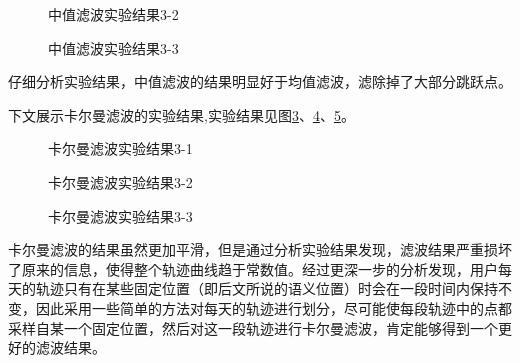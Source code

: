 \begin{figure}[htb]
  \centering%
  \hspace{4em}%
  \caption{中值滤波实验结果3-2}
  \label{fig:3_3_2}
\end{figure}
\begin{figure}[htb]
  \centering%
  \hspace{4em}%
  \caption{中值滤波实验结果3-3}
  \label{fig:3_3_3}
\end{figure}
\par 仔细分析实验结果，中值滤波的结果明显好于均值滤波，滤除掉了大部分跳跃点。
\par 下文展示卡尔曼滤波的实验结果,实验结果见图\ref{fig:3_4_1}、\ref{fig:3_4_2}、\ref{fig:3_4_3}。
\begin{figure}[htb]
  \centering%
  \hspace{4em}%
  \caption{卡尔曼滤波实验结果3-1}
  \label{fig:3_4_1}
\end{figure}
\begin{figure}[htb]
  \centering%
  \hspace{4em}%
  \caption{卡尔曼滤波实验结果3-2}
  \label{fig:3_4_2}
\end{figure}
\begin{figure}[htb]
  \centering%
  \hspace{4em}%
  \caption{卡尔曼滤波实验结果3-3}
  \label{fig:3_4_3}
\end{figure}
\par 卡尔曼滤波的结果虽然更加平滑，但是通过分析实验结果发现，滤波结果严重损坏了原来的信息，使得整个轨迹曲线趋于常数值。经过更深一步的分析发现，用户每天的轨迹只有在某些固定位置（即后文所说的语义位置）时会在一段时间内保持不变，因此采用一些简单的方法对每天的轨迹进行划分，尽可能使每段轨迹中的点都采样自某一个固定位置，然后对这一段轨迹进行卡尔曼滤波，肯定能够得到一个更好的滤波结果。
